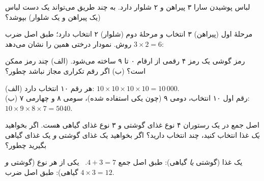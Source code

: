 \begin{example}[label=hs:ex:clothes]{لباس پوشیدن}
سارا ۳ پیراهن و ۲ شلوار دارد. به چند طریق می‌تواند یک دست لباس (یک پیراهن و یک شلوار) بپوشد؟
\begin{solution}
مرحلهٔ اول (پیراهن) ۳ انتخاب و مرحلهٔ دوم (شلوار) ۲ انتخاب دارد؛ طبق اصل ضرب $3\times2=6$ روش. نمودار درختی همین را نشان می‌دهد:
\begin{figblock}

\end{figblock}
\end{solution}
\end{example}

\begin{example}[label=hs:ex:passcode]{رمز گوشی}
یک رمز ۴ رقمی از ارقام ۰ تا ۹ ساخته می‌شود. (الف) چند رمز ممکن است؟ (ب) اگر رقم تکراری مجاز نباشد چطور؟
\begin{solution}
(الف) هر رقم ۱۰ انتخاب دارد: $10\times10\times10\times10=10\,000$.\\
(ب) رقم اول ۱۰ انتخاب، دومی ۹ (چون یکی استفاده شده)، سومی ۸ و چهارمی ۷: \ $10\times9\times8\times7=5040$.
\end{solution}
\end{example}

\begin{example}[label=hs:ex:menu]{اصل جمع}
در یک رستوران ۴ نوع غذای گوشتی و ۳ نوع غذای گیاهی هست. اگر بخواهید \emph{یک} غذا انتخاب کنید، چند انتخاب دارید؟ اگر بخواهید یک غذای گوشتی \emph{و} یک غذای گیاهی بگیرید چطور؟
\begin{solution}
یک غذا (گوشتی \emph{یا} گیاهی): طبق اصل جمع $4+3=7$. \ یکی از هر نوع (گوشتی \emph{و} گیاهی): طبق اصل ضرب $4\times3=12$.
\end{solution}
\end{example}

